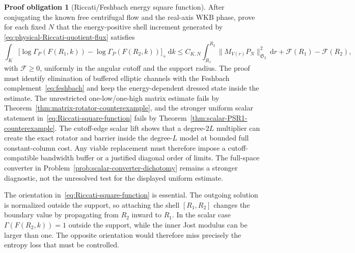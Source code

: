 \documentclass[11pt]{article}
\newcommand{\HS}{\mathfrak S_2}
\newcommand{\dd}{\,\mathrm d}
\theoremstyle{definition}
\newtheorem{problem}[theorem]{Proof obligation}
\theoremstyle{remark}
\begin{document}
\begin{problem}[Riccati/Feshbach energy square function]
\label{prob:Riccati-square-function}
After conjugating the known free centrifugal flow and the real-axis WKB phase,
prove for each fixed $N$ that the energy-positive shell increment generated by
\eqref{eq:physical-Riccati-quotient-flux} satisfies
\begin{equation}
 \int_K\bigl[\log\Gamma_P(F(R_1,k))
             -\log\Gamma_P(F(R_2,k))\bigr]_+\dd k
 \leq C_{K,N}\int_{R_1}^{R_2}\|M_{V(r)}P_N\|_{\HS}^2\dd r
      +\mathcal F(R_1)-\mathcal F(R_2),
 \label{eq:Riccati-square-function}
\end{equation}
with $\mathcal F\geq0$, uniformly in the angular cutoff and the support radius.
The proof must identify elimination of buffered elliptic channels with the
Feshbach complement~\eqref{eq:feshbach} and keep the energy-dependent dressed
 state inside the estimate.  The unrestricted one-low/one-high matrix estimate
 fails by Theorem~\ref{thm:matrix-rotator-counterexample}, and the stronger
 uniform scalar statement in~\eqref{eq:Riccati-square-function} fails by
 Theorem~\ref{thm:scalar-PSR1-counterexample}.  The cutoff-edge scalar lift
 shows that a degree-$2L$ multiplier can create the exact rotator and barrier
 inside the degree-$L$ model at bounded full constant-column cost.  Any viable
 replacement must therefore impose a cutoff-compatible bandwidth buffer or a
 justified diagonal order of limits.  The full-space converter in
 Problem~\ref{prob:scalar-converter-dichotomy} remains a stronger diagnostic,
 not the unresolved test for the displayed uniform estimate.
\end{problem}

The orientation in~\eqref{eq:Riccati-square-function} is essential.  The outgoing solution is normalized outside
the support, so attaching the shell $[R_1,R_2]$ changes the boundary value by
propagating from $R_2$ inward to $R_1$.  In the scalar case
$\Gamma(F(R_2,k))=1$ outside the support, while the inner Jost modulus can be
larger than one.  The opposite orientation would therefore miss precisely the
entropy loss that must be controlled.
\end{document}
